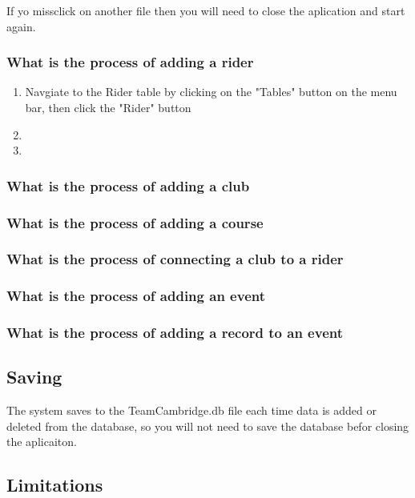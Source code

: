 If yo missclick on another file then you will need to close the aplication and start again.

\subsubsection{What is the process of adding a rider}
\begin{enumerate}
\item Navgiate to the Rider table by clicking on the "Tables" button on the menu bar, then click the "Rider" button
\item 
\item 
\end{enumerate}
\subsubsection{What is the process of adding a club}

\subsubsection{What is the process of adding a course}

\subsubsection{What is the process of connecting a club to a rider}

\subsubsection{What is the process of adding an event}

\subsubsection{What is the process of adding a record to an event}



\subsection{Saving}
The system saves to the TeamCambridge.db file each time data is added or deleted from the database, so you will not need to save the database befor closing the aplicaiton.
\subsection{Limitations}

